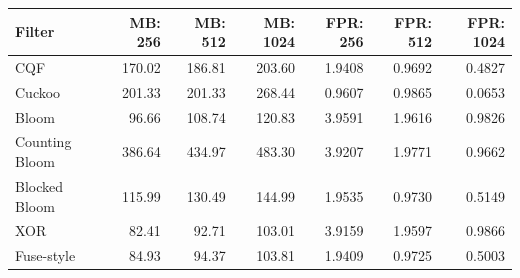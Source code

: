 \begin{tabular}{@{}lrrrrrr@{}}
\toprule
\textbf{Filter} & \textbf{MB: 256} & \textbf{MB: 512} & \textbf{MB: 1024} & \textbf{FPR: 256} & \textbf{FPR: 512} & \textbf{FPR: 1024} \\
\midrule
CQF & 170.02 & 186.81 & 203.60 & 1.9408 & 0.9692 & 0.4827 \\
Cuckoo & 201.33 & 201.33 & 268.44 & 0.9607 & 0.9865 & 0.0653 \\
Bloom & 96.66 & 108.74 & 120.83 & 3.9591 & 1.9616 & 0.9826 \\
Counting Bloom & 386.64 & 434.97 & 483.30 & 3.9207 & 1.9771 & 0.9662 \\
Blocked Bloom & 115.99 & 130.49 & 144.99 & 1.9535 & 0.9730 & 0.5149 \\
XOR & 82.41 & 92.71 & 103.01 & 3.9159 & 1.9597 & 0.9866 \\
Fuse-style & 84.93 & 94.37 & 103.81 & 1.9409 & 0.9725 & 0.5003 \\
\bottomrule
\end{tabular}
